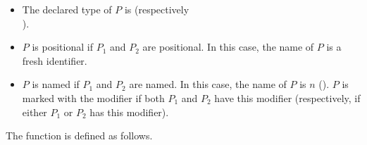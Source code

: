 \documentclass[makeidx]{article}
\begin{document}
{\begin{itemize}
\item
  The declared type of $P$ is 
  (respectively\\
  ).
\item
  $P$ is positional if $P_1$ and $P_2$ are positional.
  In this case, the name of $P$ is a fresh identifier.
\item
  $P$ is named if $P_1$ and $P_2$ are named.
  In this case, the name of $P$ is $n$
  ().
  $P$ is marked with the modifier \REQUIRED{}
  if both $P_1$ and $P_2$ have this modifier
  (respectively, if either $P_1$ or $P_2$ has this modifier).
\end{itemize}

\LMHash{}%
The function \UpperBoundTypeName{} is defined as follows.

}
\end{document}
